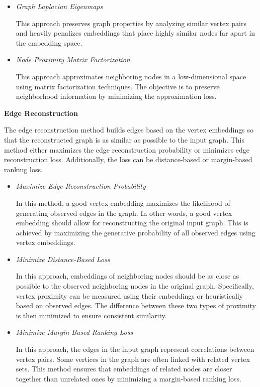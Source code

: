 \begin{itemize}
	\item \textit{Graph Laplacian Eigenmaps}
	
	This approach preserves graph properties by analyzing similar vertex pairs and heavily penalizes embeddings that place highly similar nodes far apart in the embedding space.
	
	\item \textit{Node Proximity Matrix Factorization}
	
	This approach approximates neighboring nodes in a low-dimensional space using matrix factorization techniques. The objective is to preserve neighborhood information by minimizing the approximation loss.
\end{itemize}

\textbf{Edge Reconstruction}

The edge reconstruction method builds edges based on the vertex embeddings so that the reconstructed graph is as similar as possible to the input graph. This method either maximizes the edge reconstruction probability or minimizes edge reconstruction loss. Additionally, the loss can be distance-based or margin-based ranking loss.

\begin{itemize}
	\item \textit{Maximize Edge Reconstruction Probability}
	
	In this method, a good vertex embedding maximizes the likelihood of generating observed edges in the graph. In other words, a good vertex embedding should allow for reconstructing the original input graph. This is achieved by maximizing the generative probability of all observed edges using vertex embeddings.
	
	\item \textit{Minimize Distance-Based Loss}
	
	In this approach, embeddings of neighboring nodes should be as close as possible to the observed neighboring nodes in the original graph. Specifically, vertex proximity can be measured using their embeddings or heuristically based on observed edges. The difference between these two types of proximity is then minimized to ensure consistent similarity.
	
	\item \textit{Minimize Margin-Based Ranking Loss}
	
	In this approach, the edges in the input graph represent correlations between vertex pairs. Some vertices in the graph are often linked with related vertex sets. This method ensures that embeddings of related nodes are closer together than unrelated ones by minimizing a margin-based ranking loss.
\end{itemize}

